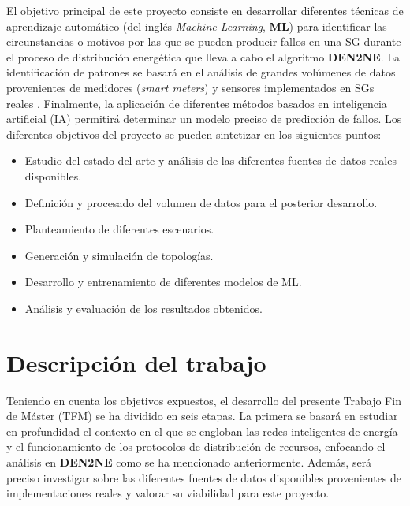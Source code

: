 El objetivo principal de este proyecto consiste en desarrollar diferentes técnicas de aprendizaje automático (del inglés \textit{Machine Learning}, \textbf{ML}) para identificar las circunstancias o motivos por las que se pueden producir fallos en una SG durante el proceso de distribución energética que lleva a cabo el algoritmo \textbf{DEN2NE}. La identificación de patrones se basará en el análisis de grandes volúmenes de datos provenientes de medidores (\textit{smart meters}) y sensores implementados en SGs reales \cite{review}\cite{sustdata}. Finalmente, la aplicación de diferentes métodos basados en inteligencia artificial (IA) permitirá determinar un modelo preciso de predicción de fallos. Los diferentes objetivos del proyecto se pueden sintetizar en los siguientes puntos:

\begin{itemize}
    \item Estudio del estado del arte y análisis de las diferentes fuentes de datos reales disponibles.
    \item Definición y procesado del volumen de datos para el posterior desarrollo. 
    \item Planteamiento de diferentes escenarios.
    \item Generación y simulación de topologías.
    \item Desarrollo y entrenamiento de diferentes modelos de ML.
    \item Análisis y evaluación de los resultados obtenidos.
\end{itemize}

\vspace{0.3cm}

\section{Descripción del trabajo}
\vspace{0.3cm}

Teniendo en cuenta los objetivos expuestos, el desarrollo del presente Trabajo Fin de Máster (TFM) se ha dividido en seis etapas. La primera se basará en estudiar en profundidad el contexto en el que se engloban las redes inteligentes de energía y el funcionamiento de los protocolos de distribución de recursos, enfocando el análisis en \textbf{DEN2NE} como se ha mencionado anteriormente. Además, será preciso investigar sobre las diferentes fuentes de datos disponibles provenientes de implementaciones reales y valorar su viabilidad para este proyecto. 

